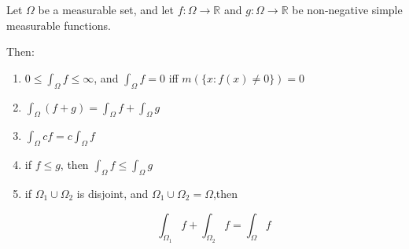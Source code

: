 \begin{thm}
    Let $\Omega$ be a measurable set, and let $f: \Omega \to \mathbb{R}$
    and $g: \Omega \to \mathbb{R}$ be non-negative simple measurable functions.

    Then:

    \begin{enumerate}
        \item $0 \le \int_{\Omega}f \le \infty$, and $\int_{\Omega}f = 0$ iff $m(\{ x: f(x) \ne 0\}) = 0$

        \item $\int_{\Omega}(f+g) = \int_{\Omega}f  + \int_{\Omega}g $

        \item $\int_{\Omega}cf = c\int_{\Omega}f$

        \item if $ f \le g$, then $\int_{\Omega}f \le \int_{\Omega}g$

        \item if $\Omega_1 \cup \Omega_2$ is disjoint, and $\Omega_1 \cup \Omega_2 = \Omega$,then

        \[
            \int_{\Omega_1} f  + \int_{\Omega_2} f = \int_{\Omega} f
        \]
    \end{enumerate}
\end{thm}

